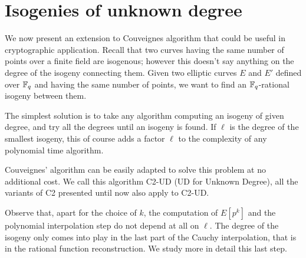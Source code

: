 \section{Isogenies of unknown degree}
\label{sec:bounded}

We now present an extension to Couveignes algorithm that could be
useful in cryptographic application. Recall that two curves having the
same number of points over a finite field are isogenous; however this
doesn't say anything on the degree of the isogeny connecting
them. Given two elliptic curves $E$ and $E'$ defined over $\mathbb{F}_q$ and
having the same number of points, we want to find an $\mathbb{F}_q$-rational
isogeny between them.

The simplest solution is to take any algorithm computing an isogeny of
given degree, and try all the degrees until an isogeny is found. If
$\ell$ is the degree of the smallest isogeny, this of course adds a
factor $\ell$ to the complexity of any polynomial time algorithm.

Couveignes' algorithm can be easily adapted to solve this problem at
no additional cost. We call this algorithm C2-UD (UD for Unknown
Degree), all the variants of C2 presented until now also apply to
C2-UD.

Observe that, apart for the choice of $k$, the computation of $E[p^k]$
and the polynomial interpolation step do not depend at all on
$\ell$. The degree of the isogeny only comes into play in the last
part of the Cauchy interpolation, that is in the rational function
reconstruction. We study more in detail this last step.


